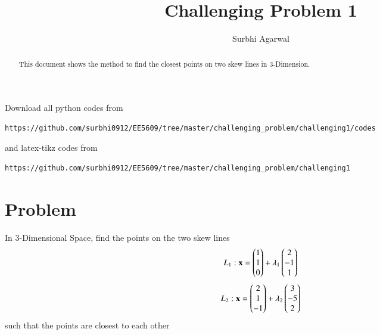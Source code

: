\documentclass[journal,12pt,twocolumn]{IEEEtran}
\begin{document}
\let\StandardTheFigure\thefigure
\let\vec\mathbf

\renewcommand{\thefigure}{\theproblem}

\def\putbox#1#2#3{\makebox[0in][l]{\makebox[#1][l]{}\raisebox{\baselineskip}[0in][0in]{\raisebox{#2}[0in][0in]{#3}}}}
     \def\rightbox#1{\makebox[0in][r]{#1}}
     \def\centbox#1{\makebox[0in]{#1}}
     \def\topbox#1{\raisebox{-\baselineskip}[0in][0in]{#1}}
     \def\midbox#1{\raisebox{-0.5\baselineskip}[0in][0in]{#1}}
\vspace{3cm}

\title{Challenging Problem 1}
\author{Surbhi Agarwal}

\maketitle

\newpage


\bigskip

\renewcommand{\thefigure}{\theenumi}
\renewcommand{\thetable}{\theenumi}

\begin{abstract}
This document shows the method to find the closest points on two skew lines in 3-Dimension.
\end{abstract}

Download all python codes from 
%
\begin{lstlisting}
https://github.com/surbhi0912/EE5609/tree/master/challenging_problem/challenging1/codes
\end{lstlisting}
%
and latex-tikz codes from 
%
\begin{lstlisting}
https://github.com/surbhi0912/EE5609/tree/master/challenging_problem/challenging1
\end{lstlisting}
%
\section{Problem}
In 3-Dimensional Space, find the points on the two skew lines
\begin{align}\label{eqn1}
    L_1 : \vec{x} = \myvec{1 \\ 1 \\ 0} + \lambda_1\myvec{2 \\ -1 \\ 1}
\end{align}
\begin{align}\label{eqn2}
    L_2 : \vec{x} = \myvec{2 \\ 1 \\ -1} + \lambda_2\myvec{3 \\ -5 \\2}
\end{align}
such that the points are closest to each other
\end{document}
